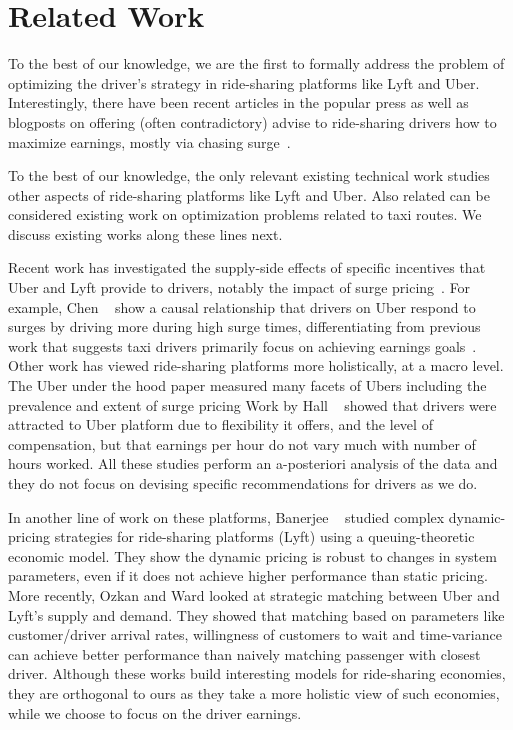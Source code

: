 
\section{Related Work}
\label{sec:related_work}

To the best of our knowledge, we are the first to formally address the problem of optimizing
the driver's strategy in ride-sharing platforms like Lyft and Uber. 
Interestingly, there have been recent articles in the popular press as well as blogposts on 
offering (often contradictory) advise to ride-sharing drivers how to maximize earnings, mostly via chasing surge~\cite{dont,tips}.

To the best of our knowledge, the only relevant existing technical work 
studies other aspects of ride-sharing platforms like Lyft and Uber. 
Also related can be considered existing work on optimization problems related to taxi routes. We discuss existing works along these lines next.


Recent work has investigated the supply-side effects of specific incentives that Uber and Lyft provide to drivers, notably the impact of surge pricing~\cite{slaves}.  For example, Chen {\etal}~\cite{chen2016dynamic} show 
a causal relationship that drivers on Uber respond to surges by driving more during high surge times,  differentiating from previous work that suggests taxi drivers primarily focus on achieving earnings goals~\cite{camerer1997labor}. 
Other work has viewed ride-sharing platforms more holistically, at a macro level.
The Uber under the hood paper measured many facets of Ubers including the prevalence and extent of surge pricing
Work by Hall {\etal}~\cite{hall2016analysis} showed that drivers were attracted to Uber platform due to flexibility it offers, 
and the level of compensation, but that earnings per hour do not vary much with number of hours worked. 
All these studies perform an a-posteriori analysis of the data
and they do not focus on devising specific recommendations for drivers as we do.


 In another line of work on these platforms, Banerjee {\etal}~\cite{banerjee2015pricing} studied complex dynamic-pricing strategies for ride-sharing platforms (Lyft) using a queuing-theoretic economic model. They show the dynamic pricing is robust to changes in system parameters, even if it does not achieve higher performance than static pricing.  More recently, Ozkan and Ward\cite{ozkan2016dynamic} looked at strategic matching between Uber and Lyft's supply and demand. They showed that matching based on parameters like customer/driver arrival rates, willingness of customers to wait and time-variance can achieve better performance than naively matching passenger with closest driver. Although these works build interesting models for ride-sharing economies, they are
 orthogonal to ours as they take a more holistic view of such economies, while we choose to focus on the driver earnings.




